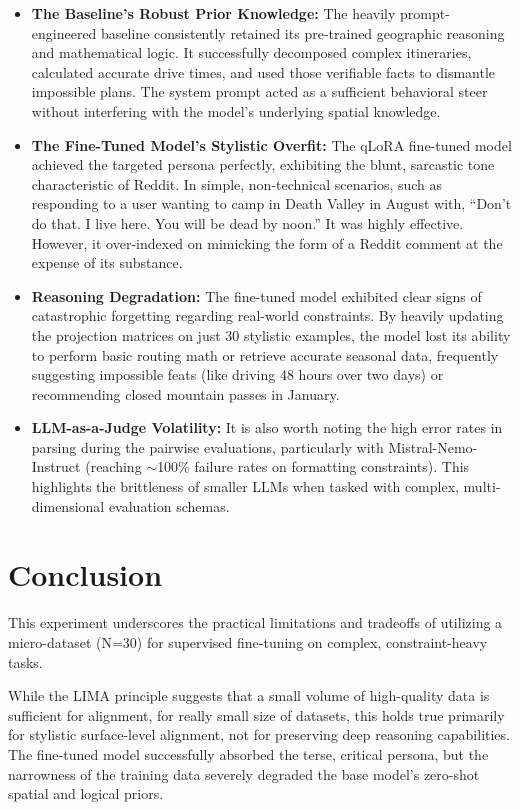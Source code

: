 \documentclass[12pt]{article}
\begin{document}
\begin{itemize}
    \item \textbf{The Baseline's Robust Prior Knowledge:} The heavily prompt-engineered baseline consistently retained its pre-trained geographic reasoning and mathematical logic. It successfully decomposed complex itineraries, calculated accurate drive times, and used those verifiable facts to dismantle impossible plans. The system prompt acted as a sufficient behavioral steer without interfering with the model's underlying spatial knowledge.

    \item \textbf{The Fine-Tuned Model's Stylistic Overfit:} The qLoRA fine-tuned model achieved the targeted persona perfectly, exhibiting the blunt, sarcastic tone characteristic of Reddit. In simple, non-technical scenarios, such as responding to a user wanting to camp in Death Valley in August with, ``Don't do that. I live here. You will be dead by noon.'' It was highly effective. However, it over-indexed on mimicking the form of a Reddit comment at the expense of its substance.

    \item \textbf{Reasoning Degradation:} The fine-tuned model exhibited clear signs of catastrophic forgetting regarding real-world constraints. By heavily updating the projection matrices on just 30 stylistic examples, the model lost its ability to perform basic routing math or retrieve accurate seasonal data, frequently suggesting impossible feats (like driving 48 hours over two days) or recommending closed mountain passes in January.

    \item \textbf{LLM-as-a-Judge Volatility:} It is also worth noting the high error rates in parsing during the pairwise evaluations, particularly with Mistral-Nemo-Instruct (reaching $\sim$100\% failure rates on formatting constraints). This highlights the brittleness of smaller LLMs when tasked with complex, multi-dimensional evaluation schemas.
\end{itemize}

\section{Conclusion}
This experiment underscores the practical limitations and tradeoffs of utilizing a micro-dataset (N=30) for supervised fine-tuning on complex, constraint-heavy tasks.

While the LIMA principle suggests that a small volume of high-quality data is sufficient for alignment, for really small size of datasets, this holds true primarily for stylistic surface-level alignment, not for preserving deep reasoning capabilities. The fine-tuned model successfully absorbed the terse, critical persona, but the narrowness of the training data severely degraded the base model's zero-shot spatial and logical priors.
\end{document}

